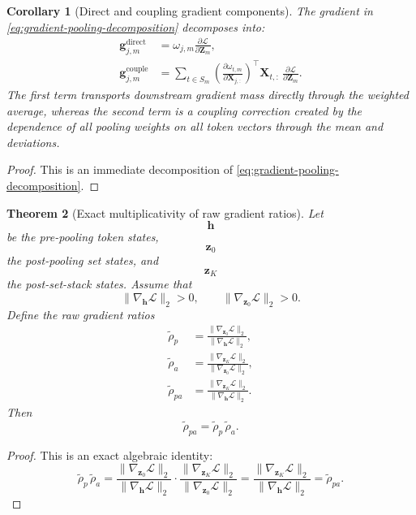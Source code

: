 \documentclass{article}
\theoremstyle{plain}
\newtheorem{theorem}{Theorem}[section]
\newtheorem{corollary}[theorem]{Corollary}
\theoremstyle{definition}
\theoremstyle{remark}
\begin{document}
\begin{corollary}[Direct and coupling gradient components]
\label{cor:direct-coupling-gradients}
The gradient in \eqref{eq:gradient-pooling-decomposition} decomposes into:
\begin{align}
\label{eq:direct-gradient-term}
\mathbf{g}^{\mathrm{direct}}_{j,m}
&=
\omega_{j,m}\frac{\partial \mathcal{L}}{\partial \mathbf{Z}_m},
\\
\label{eq:coupling-gradient-term}
\mathbf{g}^{\mathrm{couple}}_{j,m}
&=
\sum_{t\in S_m}
\left(
\frac{\partial \omega_{t,m}}{\partial \mathbf{X}_{j,:}}
\right)^{\!\top}
\!\!\mathbf{X}_{t,:}\,
\frac{\partial \mathcal{L}}{\partial \mathbf{Z}_m}.
\end{align}
The first term transports downstream gradient mass directly through the weighted average, whereas the second term is a coupling correction created by the dependence of all pooling weights on all token vectors through the mean and deviations.
\end{corollary}

\begin{proof}
This is an immediate decomposition of \eqref{eq:gradient-pooling-decomposition}.
\end{proof}

\begin{theorem}[Exact multiplicativity of raw gradient ratios]
\label{thm:raw-gradient-ratio-multiplicative}
Let
\[
\mathbf{h}
\]
be the pre-pooling token states,
\[
\mathbf{z}_0
\]
the post-pooling set states, and
\[
\mathbf{z}_K
\]
the post-set-stack states. Assume that
\[
\|\nabla_{\mathbf{h}}\mathcal{L}\|_2>0,
\qquad
\|\nabla_{\mathbf{z}_0}\mathcal{L}\|_2>0.
\]
Define the raw gradient ratios
\begin{align}
\tilde\rho_p
&=
\frac{\|\nabla_{\mathbf{z}_0}\mathcal{L}\|_2}
{\|\nabla_{\mathbf{h}}\mathcal{L}\|_2},
\\
\tilde\rho_a
&=
\frac{\|\nabla_{\mathbf{z}_K}\mathcal{L}\|_2}
{\|\nabla_{\mathbf{z}_0}\mathcal{L}\|_2},
\\
\tilde\rho_{pa}
&=
\frac{\|\nabla_{\mathbf{z}_K}\mathcal{L}\|_2}
{\|\nabla_{\mathbf{h}}\mathcal{L}\|_2}.
\end{align}
Then
\begin{equation}
\label{eq:raw-gradient-multiplicativity}
\tilde\rho_{pa}
=
\tilde\rho_p\,\tilde\rho_a.
\end{equation}
\end{theorem}

\begin{proof}
This is an exact algebraic identity:
\[
\tilde\rho_p\,\tilde\rho_a
=
\frac{\|\nabla_{\mathbf{z}_0}\mathcal{L}\|_2}
{\|\nabla_{\mathbf{h}}\mathcal{L}\|_2}
\cdot
\frac{\|\nabla_{\mathbf{z}_K}\mathcal{L}\|_2}
{\|\nabla_{\mathbf{z}_0}\mathcal{L}\|_2}
=
\frac{\|\nabla_{\mathbf{z}_K}\mathcal{L}\|_2}
{\|\nabla_{\mathbf{h}}\mathcal{L}\|_2}
=
\tilde\rho_{pa}.
\]
\end{proof}
\end{document}
